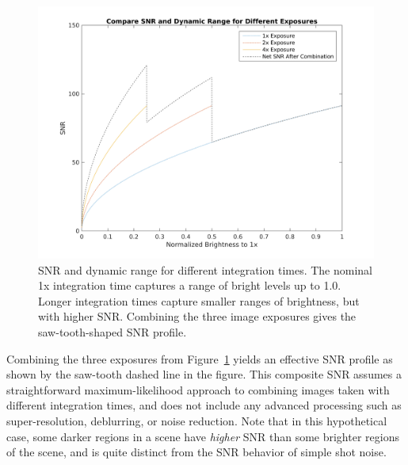 \documentclass[10pt,journal]{IEEEtran}  %
\begin{document}
\begin{figure}
  \includegraphics[width=\columnwidth]{figures/hdr-design-snr-hdr-examples.png}
  \caption{SNR and dynamic range for different integration times. The nominal 1x integration time captures a range of bright levels up to 1.0.  Longer integration times capture smaller ranges of brightness, but with higher SNR. Combining the three image exposures gives the saw-tooth-shaped SNR profile. \label{fig:hdr_snr_example}}
\end{figure}

Combining the three exposures from Figure~\ref{fig:hdr_snr_example} yields an effective SNR profile as shown by the saw-tooth dashed line in the figure. This composite SNR assumes a straightforward maximum-likelihood approach to combining images taken with different integration times, and does not include any advanced processing such as super-resolution, deblurring, or noise reduction. Note that in this hypothetical case, some darker regions in a scene have \emph{higher} SNR than some brighter regions of the scene, and is quite distinct from the SNR behavior of simple shot noise.
\end{document}
